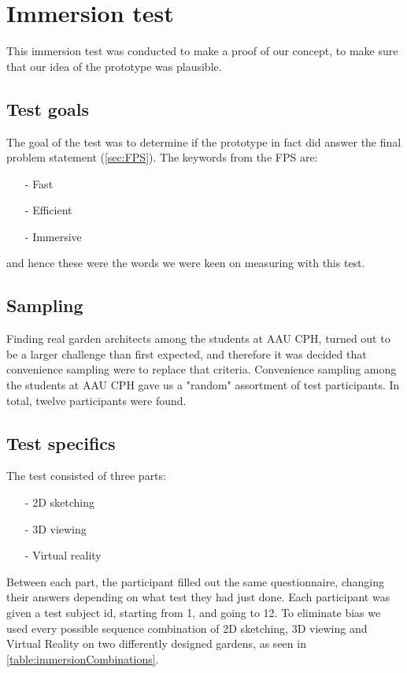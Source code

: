 \section{Immersion test}
This immersion test was conducted to make a proof of our concept, to make sure that our idea of the prototype was plausible.

\subsection{Test goals}
The goal of the test was to determine if the prototype in fact did answer the final problem statement (\autoref{sec:FPS}). The keywords from the FPS are:
\begin{itemize}
	\item[-] Fast
	\item[-] Efficient
	\item[-] Immersive
\end{itemize}
and hence these were the words we were keen on measuring with this test.
\subsection{Sampling}
Finding real garden architects among the students at AAU CPH, turned out to be a larger challenge than first expected, and therefore it was decided that convenience sampling were to replace that criteria. Convenience sampling among the students at AAU CPH gave us a "random" assortment of test participants. In total, twelve participants were found.

\subsection{Test specifics}
The test consisted of three parts:
\begin{itemize}
	\item[-] 2D sketching
	\item[-] 3D viewing
	\item[-] Virtual reality
\end{itemize}
Between each part, the participant filled out the same questionnaire, changing their answers depending on what test they had just done. Each participant was given a test subject id, starting from 1, and going to 12. To eliminate bias we used every possible sequence combination of 2D sketching, 3D viewing and Virtual Reality on two differently designed gardens, as seen in \autoref{table:immersionCombinations}.

